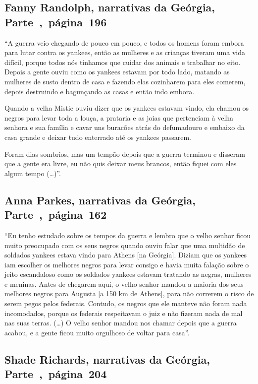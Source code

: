\subsection{Fanny Randolph, narrativas da Geórgia, Parte~,~página~196}
\label{ref221}

``A guerra veio chegando de pouco em pouco, e todos os homens foram
embora para lutar contra os yankees, então as mulheres e as crianças
tiveram uma vida difícil, porque todos nós tínhamos que cuidar dos
animais e trabalhar no eito. Depois a gente ouviu como os yankees
estavam por todo lado, matando as mulheres de susto dentro de casa e
fazendo elas cozinharem para eles comerem, depois destruindo e
bagunçando as casas e então indo embora.

Quando a velha Mistie ouviu dizer que os yankees estavam vindo, ela
chamou os negros para levar toda a louça, a prataria e as joias que
pertenciam à velha senhora e sua família e cavar uns buracões atrás do
defumadouro e embaixo da casa grande e deixar tudo enterrado até os
yankees passarem.

Foram dias sombrios, mas um tempão depois que a guerra terminou e
disseram que a gente era livre, eu não quis deixar meus brancos, então
fiquei com eles algum tempo (\ldots{})''.

\subsection{Anna Parkes, narrativas da Geórgia, Parte~,~página~162}
\label{ref209}

``Eu tenho estudado sobre os tempos da guerra e lembro que o velho
senhor ficou muito preocupado com os seus negros quando ouviu falar que
uma multidão de soldados yankees estava vindo para Athens {[}na
Geórgia{]}. Diziam que os yankees iam escolher os melhores negros para
levar consigo e havia muita falação sobre o jeito escandaloso como os
soldados yankees estavam tratando as negras, mulheres e meninas. Antes
de chegarem aqui, o velho senhor mandou a maioria dos seus melhores
negros para Augusta {[}a 150 km de Athens{]}, para não correrem o risco
de serem pegos pelos federais. Contudo, os negros que ele manteve não
foram nada incomodados, porque os federais respeitavam o juiz e não
fizeram nada de mal nas suas terras. (\ldots{}) O velho senhor mandou
nos chamar depois que a guerra acabou, e a gente ficou muito orgulhoso
de voltar para casa''.

\subsection{Shade Richards, narrativas da Geórgia, Parte~,~página~204}
\label{ref224}

